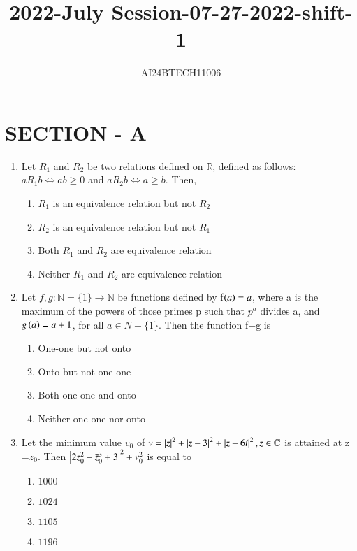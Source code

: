 \documentclass[journal,12pt,twocolumn]{IEEEtran}
\theoremstyle{remark}
\begin{document}

\vspace{3cm}
\title{2022-July Session-07-27-2022-shift-1}
\author{AI24BTECH11006}
\maketitle
\section{SECTION - A}
\begin{enumerate}[start=1]
\item Let $R_1$ and $R_2$ be two relations defined on $\mathbb{R} $, defined as follows:$a R_1 b \iff ab \geq 0$ and $a R_2 b \iff a \geq b.$ Then,
	\hfill{}
	\begin{enumerate}
    \item  $R_1$ is an equivalence relation but not $R_2$
    \item  $R_2$ is an equivalence relation but not $R_1$
    \item  Both $R_1$ and $R_2$ are equivalence relation 
    \item  Neither $R_1$ and $R_2$ are equivalence relation
\end{enumerate}
\item Let $f,g : \mathbb{N} = \{1\} \rightarrow \mathbb{N}$ be functions defined by f$\left(a\right)=a$, where a is the maximum of the powers of those primes p such that $p^a$ divides a, and $g\left(a\right)=a+1$, for all $a \in N-\{1\}$. Then the function f+g is 
\hfill{}
	\begin{enumerate}
    \item One-one but not onto
    \item Onto but not one-one
    \item Both one-one and onto
    \item Neither one-one nor onto
\end{enumerate}
\item Let the minimum value $v_0$ of $v= \left\vert z\right\vert^2 + \left\vert z - 3\right\vert^2 + \left\vert z - 6i\right\vert^2, z \in \mathbb {C}$ is attained at z =$z_0$. Then $\left\vert2z_0^2 - \bar{z}_0^3 + 3 \right\vert^2 + v_0^2$ is equal to
\hfill{}
	\begin{enumerate}
    \item $1000$
    \item $1024$
    \item $1105$
    \item $1196$
\end{enumerate}

\end{enumerate}
\end{document}
